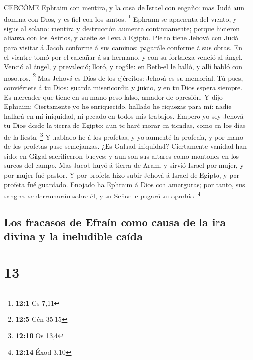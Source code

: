  CERCÓME Ephraim con mentira, y la casa de Israel con
engaño: mas Judá aun domina con Dios, y es fiel con los santos.
\footnote{\textbf{12:1} Os 7,11}  Ephraim se apacienta del
viento, y sigue al solano: mentira y destrucción aumenta continuamente;
porque hicieron alianza con los Asirios, y aceite se lleva á Egipto.
 Pleito tiene Jehová con Judá para visitar á Jacob conforme
á sus caminos: pagarále conforme á sus obras.  En el vientre
tomó por el calcañar á su hermano, y con su fortaleza venció al ángel.
 Venció al ángel, y prevaleció; lloró, y rogóle: en Beth-el
le halló, y allí habló con nosotros. \footnote{\textbf{12:5} Gén 35,15}
 Mas Jehová es Dios de los ejércitos: Jehová es su memorial.
 Tú pues, conviértete á tu Dios: guarda misericordia y
juicio, y en tu Dios espera siempre.  Es mercader que tiene
en su mano peso falso, amador de opresión.  Y dijo Ephraim:
Ciertamente yo he enriquecido, hallado he riquezas para mí: nadie
hallará en mí iniquidad, ni pecado en todos mis trabajos. 
Empero yo soy Jehová tu Dios desde la tierra de Egipto: aun te haré
morar en tiendas, como en los días de la fiesta. \footnote{\textbf{12:10}
  Os 13,4}  Y hablado he á los profetas, y yo aumenté la
profecía, y por mano de los profetas puse semejanzas.  ¿Es
Galaad iniquidad? Ciertamente vanidad han sido: en Gilgal sacrificaron
bueyes: y aun son sus altares como montones en los surcos del campo.
 Mas Jacob huyó á tierra de Aram, y sirvió Israel por
mujer, y por mujer fué pastor.  Y por profeta hizo subir
Jehová á Israel de Egipto, y por profeta fué guardado. Enojado ha
Ephraim á Dios con amarguras; por tanto, sus sangres se derramarán sobre
él, y su Señor le pagará su oprobio. \footnote{\textbf{12:14} Éxod 3,10}

\hypertarget{los-fracasos-de-efrauxedn-como-causa-de-la-ira-divina-y-la-ineludible-cauxedda}{%
\subsection{Los fracasos de Efraín como causa de la ira divina y la
ineludible
caída}\label{los-fracasos-de-efrauxedn-como-causa-de-la-ira-divina-y-la-ineludible-cauxedda}}

\hypertarget{section-12}{%
\section{13}\label{section-12}}

